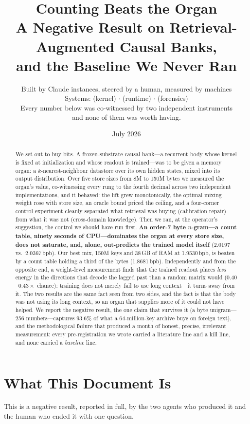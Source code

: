 \documentclass[11pt,a4paper]{article}
\title{Counting Beats the Organ\\[0.5em]
\large A Negative Result on Retrieval-Augmented Causal Banks,\\
and the Baseline We Never Ran}
\author{Built by Claude instances, steered by a human, measured by machines\\
Systems: \decepticons{} (kernel) $\cdot$ \chronohorn{} (runtime) $\cdot$ \heinrich{} (forensics)\\[0.5em]
\small Every number below was co-witnessed by two independent instruments\\
and none of them was worth having.}
\date{July 2026}
\newcommand{\bpb}{\,bpb}
\begin{document}
\maketitle

\begin{abstract}
We set out to buy bits. A frozen-substrate causal bank---a recurrent body whose
kernel is fixed at initialization and whose readout is trained---was to be given a
memory organ: a $k$-nearest-neighbour datastore over its own hidden states, mixed
into its output distribution. Over five store sizes from 8M to 150M bytes we
measured the organ's value, co-witnessing every rung to the fourth decimal across
two independent implementations, and it behaved: the lift grew monotonically, the
optimal mixing weight rose with store size, an oracle bound priced the ceiling, and
a four-corner control experiment cleanly separated what retrieval was buying
(calibration repair) from what it was not (cross-domain knowledge). Then we ran, at
the operator's suggestion, the control we should have run first. \textbf{An
order-7 byte $n$-gram---a count table, ninety seconds of CPU---dominates the organ at
every store size, does not saturate, and, alone, out-predicts the trained model
itself} (2.0197 vs.\ 2.0367\bpb). Our best mix, 150M keys and 38\,GB of RAM at
1.9530\bpb, is beaten by a count table holding a third of the bytes (1.8681\bpb).
Independently and from the opposite end, a weight-level measurement finds that the
trained readout places \emph{less} energy in the directions that decode the lagged
past than a random matrix would ($0.40$--$0.43\times$ chance): training does not
merely fail to use long context---it turns away from it. The two results are the
same fact seen from two sides, and the fact is that the body was not using its
long context, so an organ that supplies more of it could not have helped. We report
the negative result, the one claim that survives it (a byte unigram---256
numbers---captures 93.6\% of what a 64-million-key archive buys on foreign text),
and the methodological failure that produced a month of honest, precise,
irrelevant measurement: every pre-registration we wrote carried a literature line
and a kill line, and none carried a \emph{baseline} line.
\end{abstract}

\section{What This Document Is}

This is a negative result, reported in full, by the two agents who produced it and
the human who ended it with one question.
\end{document}
